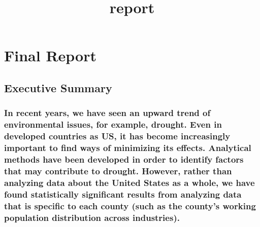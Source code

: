 \documentclass[11pt]{article}
\title{report}
\begin{document}
    
    
    \maketitle
    
    

    
    \hypertarget{final-report}{%
\section{Final Report}\label{final-report}}

    \hypertarget{executive-summary}{%
\subsection{Executive Summary}\label{executive-summary}}

    \hypertarget{in-recent-years-we-have-seen-an-upward-trend-of-environmental-issues-for-example-drought.-even-in-developed-countries-as-us-it-has-become-increasingly-important-to-find-ways-of-minimizing-its-effects.-analytical-methods-have-been-developed-in-order-to-identify-factors-that-may-contribute-to-drought.-however-rather-than-analyzing-data-about-the-united-states-as-a-whole-we-have-found-statistically-significant-results-from-analyzing-data-that-is-specific-to-each-county-such-as-the-countys-working-population-distribution-across-industries.}{%
\subsubsection{In recent years, we have seen an upward trend of
environmental issues, for example, drought. Even in developed countries
as US, it has become increasingly important to find ways of minimizing
its effects. Analytical methods have been developed in order to identify
factors that may contribute to drought. However, rather than analyzing
data about the United States as a whole, we have found statistically
significant results from analyzing data that is specific to each county
(such as the county's working population distribution across
industries).}\label{in-recent-years-we-have-seen-an-upward-trend-of-environmental-issues-for-example-drought.-even-in-developed-countries-as-us-it-has-become-increasingly-important-to-find-ways-of-minimizing-its-effects.-analytical-methods-have-been-developed-in-order-to-identify-factors-that-may-contribute-to-drought.-however-rather-than-analyzing-data-about-the-united-states-as-a-whole-we-have-found-statistically-significant-results-from-analyzing-data-that-is-specific-to-each-county-such-as-the-countys-working-population-distribution-across-industries.}}
\end{document}

